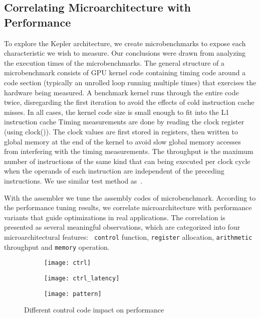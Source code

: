 \subsection{Correlating Microarchitecture with Performance}
\label{sec:benchmark}

To explore the Kepler architecture, we create microbenchmarks to expose each characteristic we wish to measure.
Our conclusions were drawn from analyzing the execution times of the microbenchmarks.
The general structure of a microbenchmark consists of GPU
kernel code containing timing code around a code section (typically an unrolled loop running multiple times) that exercises
the hardware being measured. 
A benchmark kernel runs through
the entire code twice, disregarding the first iteration to avoid the
effects of cold instruction cache misses. In all cases, the kernel
code size is small enough to fit into the L1 instruction cache
Timing measurements are done by reading the clock register (using clock()). The clock values are
first stored in registers, then written to global memory at the
end of the kernel to avoid slow global memory accesses from
interfering with the timing measurements.
The throughput is the maximum number of instructions of the same kind that can being executed per clock
cycle when the operands of each instruction are independent of the preceding instructions.
We use similar test method as~\cite{fog}.

With the assembler we tune the assembly codes of microbenchmark. According to the performance tuning results, we 
correlate microarchitecture with performance variants that guide optimizations in real applications. The correlation is 
presented as several meaningful observations, which are categorized into four microarchitectural features:  {\tt 
control} function, {\tt register} allocation, {\tt arithmetic} throughput and {\tt memory} operation.
    \begin{figure*}
        \begin{subfigure}[htbp]{0.3\textwidth}
            \texttt{[image: ctrl]}
            \label{fig:control_throughput}
        \end{subfigure}
        \begin{subfigure}[htbp]{0.3\textwidth}
            \texttt{[image: ctrl\_latency]}
            \label{fig:control_latency}
        \end{subfigure}
        \begin{subfigure}[htbp]{0.3\textwidth}
            \texttt{[image: pattern]}
            \label{fig:control_pattern}
        \end{subfigure}
        \caption{Different control code impact on performance}\label{fig:control_code}
    \end{figure*}


